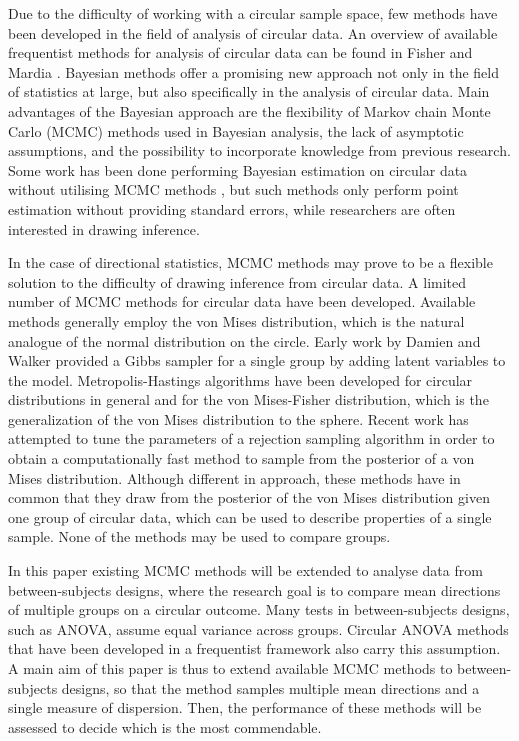 \documentclass[]{gSCS2e}
\theoremstyle{plain}
\theoremstyle{definition}
\theoremstyle{remark}
\begin{document}
Due to the difficulty of working with a circular sample space, few methods have been developed in the field of analysis of circular data. An overview of available frequentist methods for analysis of circular data can be found in Fisher \cite{fisher1995statistical} and Mardia \cite{mardia1999directional}. Bayesian methods offer a promising new approach not only in the field of statistics at large, but also specifically in the analysis of circular data. Main advantages of the Bayesian approach are the flexibility of Markov chain Monte Carlo (MCMC) methods used in Bayesian analysis, the lack of asymptotic assumptions, and the possibility to incorporate knowledge from previous research. Some work has been done performing Bayesian estimation on circular data without utilising MCMC methods \cite{dowe1996bayesian}, but such methods only perform point estimation without providing standard errors, while researchers are often interested in drawing inference. 


In the case of directional statistics, MCMC methods may prove to be a flexible solution to the difficulty of drawing inference from circular data. A limited number of MCMC methods for circular data have been developed. Available methods generally employ the von Mises distribution, which is the natural analogue of the normal distribution on the circle. Early work by Damien and Walker \cite{damien1999fullbayes} provided a Gibbs sampler for a single group by adding latent variables to the model. Metropolis-Hastings algorithms have been developed for circular distributions in general \cite{Bhattacharya2009} and for the von Mises-Fisher distribution, which is the generalization of the von Mises distribution to the sphere.\cite{nunez2005bayesian} Recent work has attempted to tune the parameters of a rejection sampling algorithm in order to obtain a computationally fast method to sample from the posterior of a von Mises distribution.\cite{forbes2014fast} Although different in approach, these methods have in common that they draw from the posterior of the von Mises distribution given one group of circular data, which can be used to describe properties of a single sample. None of the methods may be used to compare groups. 

In this paper existing MCMC methods will be extended to analyse data from between-subjects designs, where the research goal is to compare mean directions of multiple groups on a circular outcome. Many tests in between-subjects designs, such as ANOVA, assume equal variance across groups. Circular ANOVA methods that have been developed in a frequentist framework also carry this assumption.\cite{harrison1988development, harrison1986analysis} A main aim of this paper is thus to extend available MCMC methods to between-subjects designs, so that the method samples multiple mean directions and a single measure of dispersion. Then, the performance of these methods will be assessed to decide which is the most commendable. 
\end{document}
